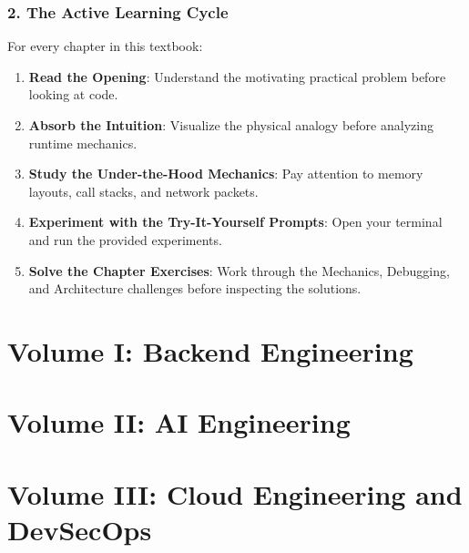 \documentclass[11pt,oneside]{book}
\begin{document}
\section*{2. The Active Learning Cycle}
For every chapter in this textbook:
\begin{enumerate}[leftmargin=18pt]
  \item \textbf{Read the Opening}: Understand the motivating practical problem before looking at code.
  \item \textbf{Absorb the Intuition}: Visualize the physical analogy before analyzing runtime mechanics.
  \item \textbf{Study the Under-the-Hood Mechanics}: Pay attention to memory layouts, call stacks, and network packets.
  \item \textbf{Experiment with the Try-It-Yourself Prompts}: Open your terminal and run the provided experiments.
  \item \textbf{Solve the Chapter Exercises}: Work through the Mechanics, Debugging, and Architecture challenges before inspecting the solutions.
\end{enumerate}

\newpage
\tableofcontents

\mainmatter

\part{Volume I: Backend Engineering}









\part{Volume II: AI Engineering}








\part{Volume III: Cloud Engineering and DevSecOps}








\end{document}
